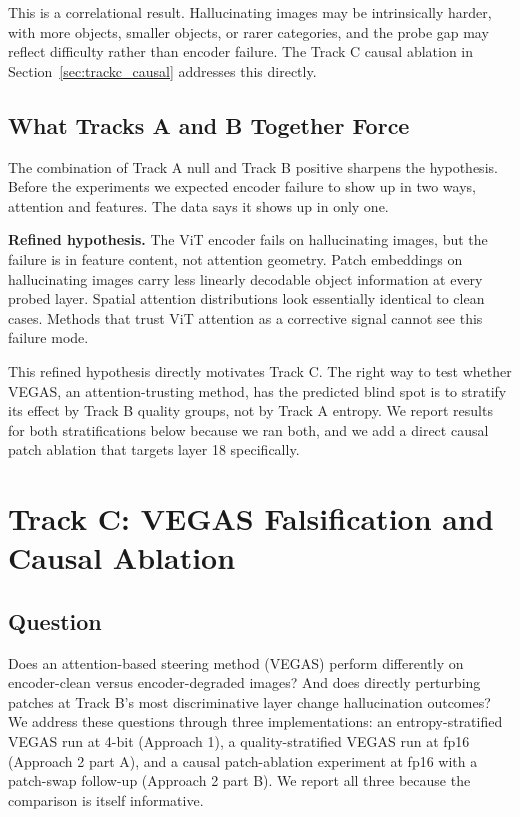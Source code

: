 \documentclass[11pt]{article}
\begin{document}
This is a correlational result. Hallucinating images may be intrinsically harder, with
more objects, smaller objects, or rarer categories, and the probe gap may reflect
difficulty rather than encoder failure. The Track C causal ablation in
Section~\ref{sec:trackc_causal} addresses this directly.

\subsection{What Tracks A and B Together Force}

The combination of Track A null and Track B positive sharpens the hypothesis. Before
the experiments we expected encoder failure to show up in two ways, attention and
features. The data says it shows up in only one.

\begin{framed}
\noindent\textbf{Refined hypothesis.} The ViT encoder fails on hallucinating images, but
the failure is in feature content, not attention geometry. Patch embeddings on
hallucinating images carry less linearly decodable object information at every probed
layer. Spatial attention distributions look essentially identical to clean cases.
Methods that trust ViT attention as a corrective signal cannot see this failure mode.
\end{framed}

This refined hypothesis directly motivates Track C. The right way to test whether
VEGAS, an attention-trusting method, has the predicted blind spot is to stratify its
effect by Track B quality groups, not by Track A entropy. We report results for both
stratifications below because we ran both, and we add a direct causal patch ablation
that targets layer 18 specifically.

\section{Track C: VEGAS Falsification and Causal Ablation}

\subsection{Question}

Does an attention-based steering method (VEGAS) perform differently on encoder-clean
versus encoder-degraded images? And does directly perturbing patches at Track B's most
discriminative layer change hallucination outcomes? We address these questions through
three implementations: an entropy-stratified VEGAS run at 4-bit (Approach 1), a
quality-stratified VEGAS run at fp16 (Approach 2 part A), and a causal patch-ablation
experiment at fp16 with a patch-swap follow-up (Approach 2 part B). We report all three
because the comparison is itself informative.
\end{document}
